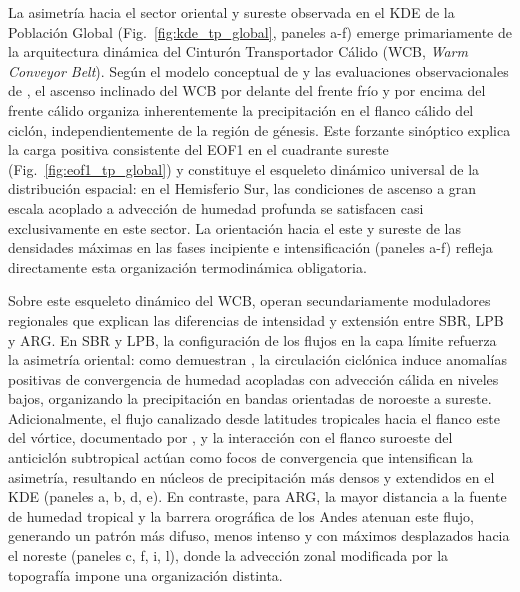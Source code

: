La asimetría hacia el sector oriental y sureste observada en el KDE de la Población Global (Fig.~\ref{fig:kde_tp_global}, paneles a-f) emerge primariamente de la arquitectura dinámica del Cinturón Transportador Cálido (WCB, \textit{Warm Conveyor Belt}). Según el modelo conceptual de \citet{browning1986conceptual} y las evaluaciones observacionales de \citet{naud2020evaluation}, el ascenso inclinado del WCB por delante del frente frío y por encima del frente cálido organiza inherentemente la precipitación en el flanco cálido del ciclón, independientemente de la región de génesis. Este forzante sinóptico explica la carga positiva consistente del EOF1 en el cuadrante sureste (Fig.~\ref{fig:eof1_tp_global}) y constituye el esqueleto dinámico universal de la distribución espacial: en el Hemisferio Sur, las condiciones de ascenso a gran escala acoplado a advección de humedad profunda se satisfacen casi exclusivamente en este sector. La orientación hacia el este y sureste de las densidades máximas en las fases incipiente e intensificación (paneles a-f) refleja directamente esta organización termodinámica obligatoria.

Sobre este esqueleto dinámico del WCB, operan secundariamente moduladores regionales que explican las diferencias de intensidad y extensión entre SBR, LPB y ARG. En SBR y LPB, la configuración de los flujos en la capa límite refuerza la asimetría oriental: como demuestran \citet{cardoso2022synoptic}, la circulación ciclónica induce anomalías positivas de convergencia de humedad acopladas con advección cálida en niveles bajos, organizando la precipitación en bandas orientadas de noroeste a sureste. Adicionalmente, el flujo canalizado desde latitudes tropicales hacia el flanco este del vórtice, documentado por \citet{vera2002cold}, y la interacción con el flanco suroeste del anticiclón subtropical actúan como focos de convergencia que intensifican la asimetría, resultando en núcleos de precipitación más densos y extendidos en el KDE (paneles a, b, d, e). En contraste, para ARG, la mayor distancia a la fuente de humedad tropical y la barrera orográfica de los Andes atenuan este flujo, generando un patrón más difuso, menos intenso y con máximos desplazados hacia el noreste (paneles c, f, i, l), donde la advección zonal modificada por la topografía impone una organización distinta.

